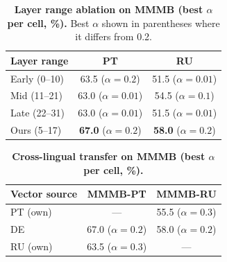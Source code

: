 \documentclass[11pt]{article}
\begin{document}
\begin{table}[t]
\centering
\small
\caption{
  \textbf{Layer range ablation on MMMB (best $\alpha$ per cell, \%).}
  Best $\alpha$ shown in parentheses where it differs from 0.2.
}
\label{tab:layer_ablation}
\begin{tabular}{lcc}
\toprule
\textbf{Layer range} & \textbf{PT} & \textbf{RU} \\
\midrule
Early (0--10)    & 63.5 ($\alpha{=}0.2$)  & 51.5 ($\alpha{=}0.01$) \\
Mid   (11--21)   & 63.0 ($\alpha{=}0.01$) & 54.5 ($\alpha{=}0.1$)  \\
Late  (22--31)   & 63.0 ($\alpha{=}0.01$) & 51.5 ($\alpha{=}0.01$) \\
Ours  (5--17)    & \textbf{67.0} ($\alpha{=}0.2$) & \textbf{58.0} ($\alpha{=}0.2$) \\
\bottomrule
\end{tabular}
\end{table}

\begin{table}[t]
\centering
\small
\caption{
  \textbf{Visual token ablation on MMMB (\%).}
  ``Steer'' = best $\alpha$: $\alpha{=}0.2$ (real), $\alpha{=}0.02$ (blank).
}
\label{tab:visual_ablation}
\end{table}

\begin{table}[t]
\centering
\small
\caption{
  \textbf{Cross-lingual transfer on MMMB (best $\alpha$ per cell, \%).}
}
\label{tab:cross_lingual}
\begin{tabular}{lcc}
\toprule
\textbf{Vector source} & \textbf{MMMB-PT} & \textbf{MMMB-RU} \\
\midrule
PT (own) & ---                   & 55.5 ($\alpha{=}0.3$) \\
DE       & 67.0 ($\alpha{=}0.2$) & 58.0 ($\alpha{=}0.2$) \\
RU (own) & 63.5 ($\alpha{=}0.3$) & ---  \\
\bottomrule
\end{tabular}
\end{table}
\end{document}
